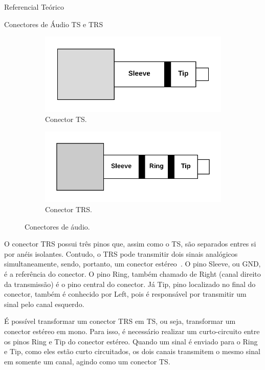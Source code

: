 \begin{chapter}{Referencial Teórico}
\begin{section}{Conectores de Áudio TS e TRS}
\begin{figure}
\centering
\begin{subfigure}{.4\textwidth}
  \centering
  \includegraphics[width=1\linewidth, height=0.2\textheight]{fig/ts}
  \caption{Conector TS.}
  \label{fig:ts}
\end{subfigure}%
\begin{subfigure}{0.4\textwidth}
  \centering
  \includegraphics[width=1\linewidth, height=0.2\textheight]{fig/trs}
  \caption{Conector TRS.}
  \label{fig:trs}
\end{subfigure}
\caption{Conectores de áudio.}
\label{fig:conector}
\end{figure}

O conector TRS possui três pinos que, assim como o TS, são separados 
entres si por anéis isolantes. Contudo, o TRS pode transmitir dois sinais
analógicos simultaneamente, sendo, portanto, um conector estéreo~\cite{ts}. O
pino Sleeve, ou GND, é a referência do conector. O pino Ring, também chamado de
Right (canal direito da transmissão) é o  pino central do conector. Já Tip,
pino localizado no final do conector, também é conhecido por Left, pois é 
responsável por transmitir um sinal pelo canal esquerdo.
  
É possível transformar um conector TRS em TS, ou seja, transformar um conector
estéreo em mono. Para isso, é necessário realizar um curto-circuito entre os
pinos Ring e Tip do conector estéreo. Quando um sinal é enviado para o Ring e
Tip, como eles estão curto circuitados, os dois canais transmitem o mesmo
sinal em somente um canal, agindo como um conector TS.



\end{section}
\end{chapter}
